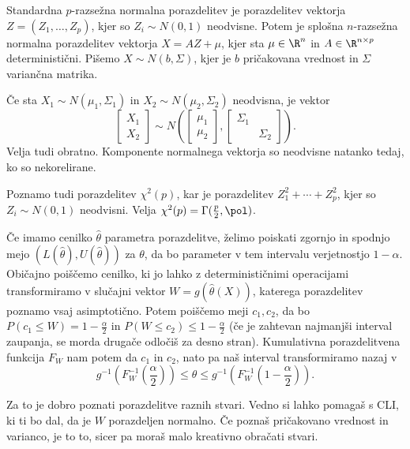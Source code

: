 
Standardna $p$-razsežna normalna porazdelitev je porazdelitev vektorja $Z =
(Z_1, \ldots, Z_p)$, kjer so $Z_i \sim N(0,1)$ neodvisne.
Potem je splošna $n$-razsežna normalna porazdelitev vektorja $X = AZ + \mu$,
kjer sta $\mu \in \R^n$ in $A \in \R^{n \times p}$ deterministični.
Pišemo $X \sim N(b, \Sigma)$, kjer je $b$ pričakovana vrednost in $\Sigma$
variančna matrika.

Če sta $X_1 \sim N(\mu_1, \Sigma_1)$ in $X_2 \sim N(\mu_2, \Sigma_2)$ neodvisna,
je vektor
\[
  \begin{bmatrix}
	X_1 \\ X_2
  \end{bmatrix}
  \sim
  N\!\left(
	\begin{bmatrix}
	  \mu_1 \\ \mu_2
	\end{bmatrix},
	\begin{bmatrix}
	  \Sigma_1 & \\ & \Sigma_2
	\end{bmatrix}
  \right).
\]
Velja tudi obratno.
Komponente normalnega vektorja so neodvisne natanko tedaj, ko so nekorelirane.

Poznamo tudi porazdelitev $\chi^2(p)$, kar je porazdelitev $Z_1^2 + \cdots +
Z_p^2$, kjer so $Z_i \sim N(0,1)$ neodvisni.
Velja $\chi^2(p) = \Gamma(\frac{p}{2}, \pol)$.


Če imamo cenilko $\hat{\theta}$ parametra porazdelitve, želimo poiskati
zgornjo in spodnjo mejo $(L(\hat{\theta}), U(\hat{\theta}))$ za $\theta$, da bo
parameter v tem intervalu  verjetnostjo $1 - \alpha$.
Običajno poiščemo cenilko, ki jo lahko z determinističnimi operacijami
transformiramo v slučajni vektor $W = g(\hat{\theta}(X))$, katerega porazdelitev
poznamo vsaj asimptotično.
Potem poiščemo meji $c_1, c_2$, da bo $P(c_1 \le W) = 1 - \frac{\alpha}{2}$ in
$P(W \le c_2) \le 1 - \frac{\alpha}{2}$ (če je zahtevan najmanjši interval
zaupanja, se morda drugače odločiš za desno stran).
Kumulativna porazdelitvena funkcija $F_W$ nam potem da $c_1$ in $c_2$, nato pa
naš interval transformiramo nazaj v
\[
  g^{-1}(F_W^{-1}(\frac{\alpha}{2}))
  \le \theta
  \le g^{-1}(F_W^{-1}(1 - \frac{\alpha}{2})).
\]

Za to je dobro poznati porazdelitve raznih stvari.
Vedno si lahko pomagaš s CLI, ki ti bo dal, da je $W$ porazdeljen normalno.
Če poznaš pričakovano vrednost in varianco, je to to, sicer pa moraš malo
kreativno obračati stvari.

